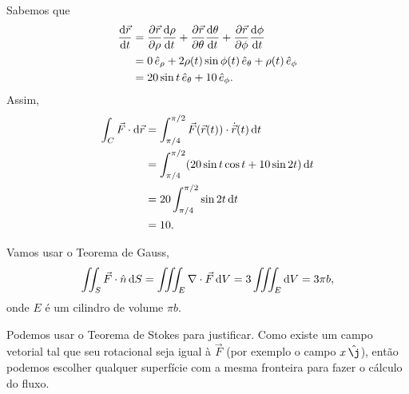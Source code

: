 \begin{questions}
\begin{solution}
Sabemos que
\begin{align*}
    \frac{\mathrm{d} \vec r}{\mathrm{d} t} &= \frac{\partial \vec r}{\partial \rho} \frac{\mathrm{d} \rho }{\mathrm{d} t} + \frac{\partial \vec r}{\partial \theta} \frac{\mathrm{d} \theta}{\mathrm{d} t} + \frac{\partial \vec r}{\partial \phi} \frac{\mathrm{d} \phi}{\mathrm{d} t} \\
        &= 0 \, \hat e_\rho + 2 \rho(t) \sin \phi(t) \, \hat e_\theta + \rho(t) \, \hat e_\phi \\
        &= 20\sin t \,\hat e_\theta + 10 \,\hat e_\phi.
\end{align*}
Assim,
\begin{align*}
    \int_C \vec F \cdot \mathrm{d} \vec r
        &= \int_{\pi/4}^{\pi/2} \vec F(\vec r(t)) \cdot \dot{\vec r}(t) \,\mathrm{d} t\\
        &= \int_{\pi/4}^{\pi/2} (20 \sin t \cos t + 10 \sin 2t)\,\mathrm{d} t \\
        &= 20 \int_{\pi/4}^{\pi/2} \sin 2t\,\mathrm{d} t\\
        &= 10.
\end{align*}
\end{solution}


\begin{solution}
Vamos usar o Teorema de Gauss,
\begin{align*}
    \iint_S \vec F \cdot \hat n \, \mathrm{d} S = \iiint_E \nabla\cdot\vec F \,\mathrm{d} V
        = 3 \iiint_E \mathrm{d} V
        = 3 \pi b,
\end{align*}
    onde $E$ é um cilindro de volume $\pi b$.
\end{solution}


\begin{solution}
    Podemos usar o Teorema de Stokes para justificar. Como existe um campo vetorial tal que seu rotacional seja igual à $\vec F$ (por exemplo o campo $x\, \hat \j$), então podemos escolher qualquer superfície com a mesma fronteira para fazer o cálculo do fluxo.
    

\end{solution}
\end{questions}
